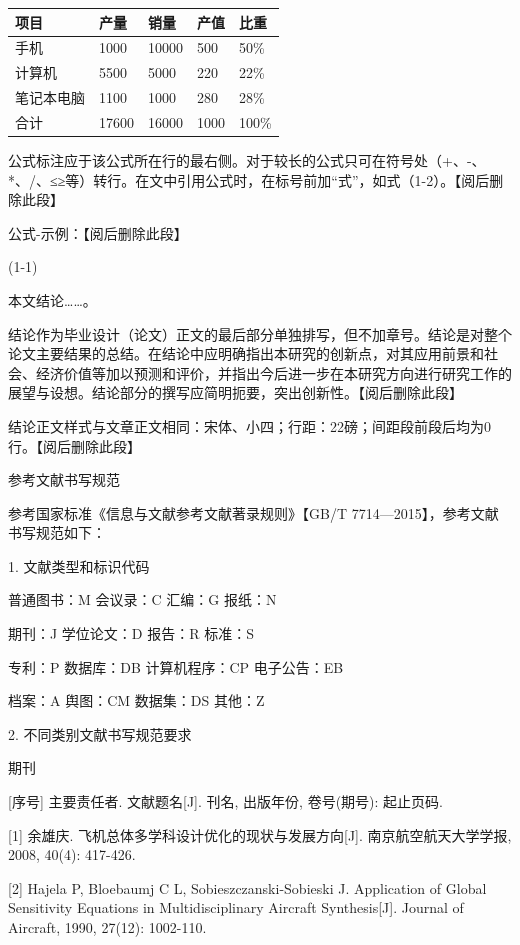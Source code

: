\documentclass[UTF8,12pt,a4paper,fontset=fandol]{ctexbook}
\begin{document}
\begin{longtable}{p{}p{}p{}p{}p{}}
\toprule
项目 & 产量 & 销量 & 产值 & 比重 \\
\midrule
手机 & 1000 & 10000 & 500 & 50\% \\
计算机 & 5500 & 5000 & 220 & 22\% \\
笔记本电脑 & 1100 & 1000 & 280 & 28\% \\
合计 & 17600 & 16000 & 1000 & 100\% \\
\bottomrule
\end{longtable}

公式标注应于该公式所在行的最右侧。对于较长的公式只可在符号处（+、-、*、/、≤≥等）转行。在文中引用公式时，在标号前加“式”，如式（1-2）。【阅后删除此段】

公式-示例：【阅后删除此段】

(1-1)

本文结论……。

结论作为毕业设计（论文）正文的最后部分单独排写，但不加章号。结论是对整个论文主要结果的总结。在结论中应明确指出本研究的创新点，对其应用前景和社会、经济价值等加以预测和评价，并指出今后进一步在本研究方向进行研究工作的展望与设想。结论部分的撰写应简明扼要，突出创新性。【阅后删除此段】

结论正文样式与文章正文相同：宋体、小四；行距：22磅；间距段前段后均为0行。【阅后删除此段】

参考文献书写规范

参考国家标准《信息与文献参考文献著录规则》【GB/T 7714—2015】，参考文献书写规范如下：

1. 文献类型和标识代码

普通图书：M     会议录：C       汇编：G          报纸：N

期刊：J        学位论文：D       报告：R          标准：S

专利：P        数据库：DB     计算机程序：CP   电子公告：EB

档案：A         舆图：CM       数据集：DS        其他：Z

2. 不同类别文献书写规范要求

期刊

[序号] 主要责任者. 文献题名[J]. 刊名, 出版年份, 卷号(期号): 起止页码.

[1] 余雄庆. 飞机总体多学科设计优化的现状与发展方向[J]. 南京航空航天大学学报, 2008, 40(4): 417-426.

[2] Hajela P, Bloebaumj C L, Sobieszczanski-Sobieski J. Application of Global Sensitivity Equations in Multidisciplinary Aircraft Synthesis[J]. Journal of Aircraft, 1990, 27(12): 1002-110.
\end{document}
